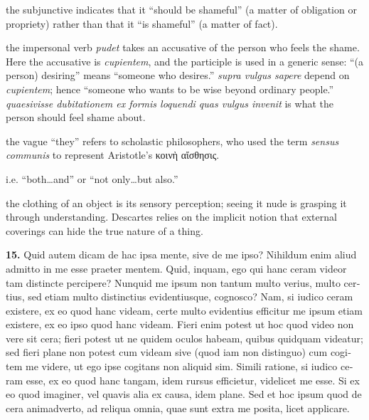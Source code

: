  the subjunctive indicates that it ``should be shameful'' (a matter of obligation or propriety) rather than that it ``is shameful'' (a matter of fact).

 the impersonal verb \textit{pudet} takes an accusative of the person who feels the shame. Here the accusative is \textit{cupientem}, and the participle is used in a generic sense: ``(a person) desiring'' means ``someone who desires.'' \textit{supra vulgus sapere} depend on \textit{cupientem}; hence ``someone who wants to be wise beyond ordinary people.'' \textit{quaesivisse dubitationem ex formis loquendi quas vulgus invenit} is what the person should feel shame about.

 the vague ``they'' refers to scholastic philosophers, who used the term \textit{sensus communis} to represent Aristotle's κοινὴ αἴσθησις.

 i.e. ``both\dots and'' or ``not only\dots but also.''

 the clothing of an object is its sensory perception; seeing it nude is grasping it through understanding. Descartes relies on the implicit notion that external coverings can hide the true nature of a thing.

\clearpage

\beginnumbering
\pstart
\begin{latin}
    \textenglish{\textbf{15.}} Quid autem dicam de hac ipsa mente, sive de me ipso? Nihildum enim aliud admitto in me esse praeter mentem. Quid, inquam, ego qui hanc ceram videor tam distincte percipere? Nunquid me ipsum non tantum multo verius, multo certius, sed etiam multo distinctius evidentiusque, cognosco? Nam, si iudico ceram existere, ex eo quod hanc videam, certe multo evidentius efficitur me ipsum etiam existere, ex eo ipso quod hanc videam. Fieri enim potest ut hoc quod video non vere sit cera; fieri potest ut ne quidem oculos habeam, quibus quidquam videatur; sed fieri plane non potest cum videam sive (quod iam non distinguo) cum cogitem me videre, ut ego ipse cogitans non aliquid sim. Simili ratione, si iudico ceram esse, ex eo quod hanc tangam, idem rursus efficietur, videlicet me esse. Si ex eo quod imaginer, vel quavis alia ex causa, idem plane. Sed et hoc ipsum quod de cera animadverto, ad reliqua omnia, quae sunt extra me posita, licet applicare.
\end{latin}
\pend
\endnumbering

